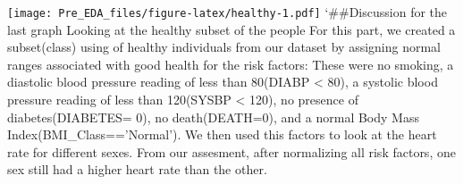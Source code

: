 \documentclass[]{article}
\begin{document}
\texttt{[image: Pre\_EDA\_files/figure-latex/healthy-1.pdf]}
`\#\#Discussion for the last graph Looking at the healthy subset of the
people For this part, we created a subset(class) using of healthy
individuals from our dataset by assigning normal ranges associated with
good health for the risk factors: These were no smoking, a diastolic
blood pressure reading of less than 80(DIABP \textless{} 80), a systolic
blood pressure reading of less than 120(SYSBP \textless{} 120), no
presence of diabetes(DIABETES= 0), no death(DEATH=0), and a normal Body
Mass Index(BMI\_Class=='Normal'). We then used this factors to look at
the heart rate for different sexes. From our assesment, after
normalizing all risk factors, one sex still had a higher heart rate than
the other.
\end{document}
